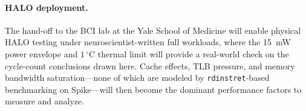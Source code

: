 \paragraph{HALO deployment.}
The hand-off to the BCI lab at the Yale School of Medicine will enable physical HALO testing under neuroscientist-written full workloads, where the 15~mW power envelope and $1\,^{\circ}$C thermal limit will provide a real-world check on the cycle-count conclusions drawn here. Cache effects, TLB pressure, and memory bandwidth saturation---none of which are modeled by \texttt{rdinstret}-based benchmarking on Spike---will then become the dominant performance factors to measure and analyze.

